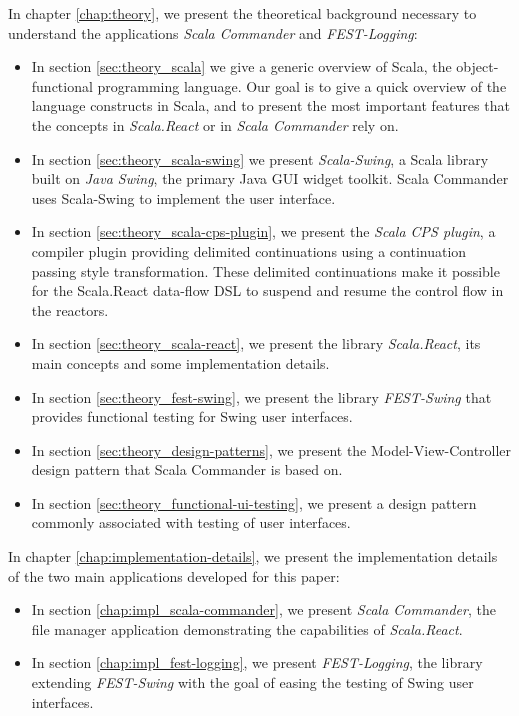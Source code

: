 In chapter \ref{chap:theory}, we present the theoretical background necessary to understand the applications \emph{Scala Commander} and \emph{FEST-Logging}:
\begin{itemize}
\item In section \ref{sec:theory_scala} we give a generic overview of Scala, the object-functional programming language. Our goal is to give a quick overview of the language constructs in Scala, and to present the most important features that the concepts in \emph{Scala.React} or in \emph{Scala Commander} rely on. %

\item In section \ref{sec:theory_scala-swing} we present \emph{Scala-Swing}, a Scala library built on \emph{Java Swing}, the primary Java GUI widget toolkit. \cite{SwingWiki} Scala Commander uses Scala-Swing to implement the user interface.

\item In section \ref{sec:theory_scala-cps-plugin}, we present the \emph{Scala CPS plugin}, a compiler plugin providing delimited continuations using a continuation passing style transformation. These delimited continuations make it possible for the Scala.React data-flow DSL to suspend and resume the control flow in the reactors.

\item In section \ref{sec:theory_scala-react}, we present the library \emph{Scala.React}, its main concepts and some implementation details.

\item In section \ref{sec:theory_fest-swing}, we present the library \emph{FEST-Swing} that provides functional testing for Swing user interfaces.

\item In section \ref{sec:theory_design-patterns}, we present the Model-View-Controller design pattern that Scala Commander is based on.

\item In section \ref{sec:theory_functional-ui-testing}, we present a design pattern commonly associated with testing of user interfaces.
\end{itemize}

In chapter \ref{chap:implementation-details}, we present the implementation details of the two main applications developed for this paper:
\begin{itemize}
\item In section \ref{chap:impl_scala-commander}, we present \emph{Scala Commander}, the file manager application demonstrating the capabilities of \emph{Scala.React}.
\item In section \ref{chap:impl_fest-logging}, we present \emph{FEST-Logging}, the library extending \emph{FEST-Swing} with the goal of easing the testing of Swing user interfaces.
\end{itemize}







